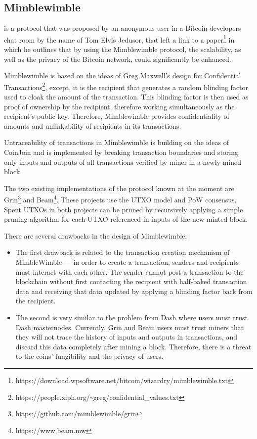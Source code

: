 \documentclass[8pt,fleqn,openany]{book}
\begin{document}
\subsection{Mimblewimble} is a protocol that was proposed by an anonymous user in a Bitcoin developers chat room by the name of Tom Elvis Jedusor, that left a link to a paper\footnote{https://download.wpsoftware.net/bitcoin/wizardry/mimblewimble.txt} in which he outlines that by using the Mimblewimble protocol, the scalability, as well as the privacy of the Bitcoin network, could significantly be enhanced.

Mimblewimble is based on the ideas of Greg Maxwell’s design for Confidential Transactions\footnote{https://people.xiph.org/\texttt{\~}greg/confidential\_values.txt}, except, it is the recipient that generates a random blinding factor used to cloak the amount of the transaction. This blinding factor is then used as proof of ownership by the recipient, therefore working simultaneously as the recipient’s public key. Therefore, Mimblewimble provides confidentiality of amounts and unlinkability of recipients in its transactions.

Untraceability of transactions in Mimblewimble is building on the ideas of CoinJoin and is implemented by breaking transaction boundaries and storing only inputs and outputs of all transactions verified by miner in a newly mined block.

The two existing implementations of the protocol known at the moment are Grin\footnote{https://github.com/mimblewimble/grin} and Beam\footnote{https://www.beam.mw}. These projects use the UTXO model and PoW consensus. Spent UTXOs in both projects can be pruned by recursively applying a simple pruning algorithm for each UTXO referenced in inputs of the new minted block.

There are several drawbacks in the design of Mimblewimble:

\begin{itemize}
  \item {The first drawback is related to the transaction creation mechanism of MimbleWimble — in order to create a transaction, senders and recipients must interact with each other. The sender cannot post a transaction to the blockchain without first contacting the recipient with half-baked transaction data and receiving that data updated by applying a blinding factor back from the recipient.}
  \item {The second is very similar to the problem from Dash where users must trust Dash masternodes. Currently, Grin and Beam users must trust miners that they will not trace the history of inputs and outputs in transactions, and discard this data completely after mining a block. Therefore, there is a threat to the coins’ fungibility and the privacy of users.}
\end{itemize}
\end{document}
